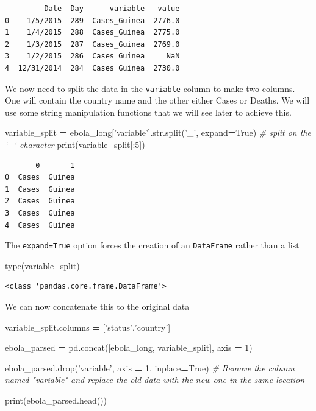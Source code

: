 \documentclass[
  letterpaper,
]{scrbook}
\newenvironment{Shaded}{\begin{snugshade}}{\end{snugshade}}
\newcommand{\BuiltInTok}[1]{#1}
\newcommand{\CommentTok}[1]{\textcolor[rgb]{0.56,0.35,0.01}{\textit{#1}}}
\newcommand{\DecValTok}[1]{\textcolor[rgb]{0.00,0.00,0.81}{#1}}
\newcommand{\NormalTok}[1]{#1}
\newcommand{\OperatorTok}[1]{\textcolor[rgb]{0.81,0.36,0.00}{\textbf{#1}}}
\newcommand{\StringTok}[1]{\textcolor[rgb]{0.31,0.60,0.02}{#1}}
\newcommand{\VariableTok}[1]{\textcolor[rgb]{0.00,0.00,0.00}{#1}}
\begin{document}
\begin{verbatim}
         Date  Day      variable   value
0    1/5/2015  289  Cases_Guinea  2776.0
1    1/4/2015  288  Cases_Guinea  2775.0
2    1/3/2015  287  Cases_Guinea  2769.0
3    1/2/2015  286  Cases_Guinea     NaN
4  12/31/2014  284  Cases_Guinea  2730.0
\end{verbatim}

We now need to split the data in the \texttt{variable} column to make two columns. One will contain the country name and the other either Cases or Deaths. We will use some string manipulation functions that we will see later to achieve this.

\begin{Shaded}
\begin{Highlighting}[]
\NormalTok{variable_split }\OperatorTok{=}\NormalTok{ ebola_long[}\StringTok{'variable'}\NormalTok{].}\BuiltInTok{str}\NormalTok{.split(}\StringTok{'_'}\NormalTok{, expand}\OperatorTok{=}\VariableTok{True}\NormalTok{) }\CommentTok{# split on the `_` character}
\BuiltInTok{print}\NormalTok{(variable_split[:}\DecValTok{5}\NormalTok{])}
\end{Highlighting}
\end{Shaded}

\begin{verbatim}
       0       1
0  Cases  Guinea
1  Cases  Guinea
2  Cases  Guinea
3  Cases  Guinea
4  Cases  Guinea
\end{verbatim}

The \texttt{expand=True} option forces the creation of an \texttt{DataFrame} rather than a list

\begin{Shaded}
\begin{Highlighting}[]
\BuiltInTok{type}\NormalTok{(variable_split)}
\end{Highlighting}
\end{Shaded}

\begin{verbatim}
<class 'pandas.core.frame.DataFrame'>
\end{verbatim}

We can now concatenate this to the original data

\begin{Shaded}
\begin{Highlighting}[]
\NormalTok{variable_split.columns }\OperatorTok{=}\NormalTok{ [}\StringTok{'status'}\NormalTok{,}\StringTok{'country'}\NormalTok{]}

\NormalTok{ebola_parsed }\OperatorTok{=}\NormalTok{ pd.concat([ebola_long, variable_split], axis }\OperatorTok{=} \DecValTok{1}\NormalTok{)}

\NormalTok{ebola_parsed.drop(}\StringTok{'variable'}\NormalTok{, axis }\OperatorTok{=} \DecValTok{1}\NormalTok{, inplace}\OperatorTok{=}\VariableTok{True}\NormalTok{) }\CommentTok{# Remove the column named "variable" and replace the old data with the new one in the same location}

\BuiltInTok{print}\NormalTok{(ebola_parsed.head())}
\end{Highlighting}
\end{Shaded}
\end{document}
